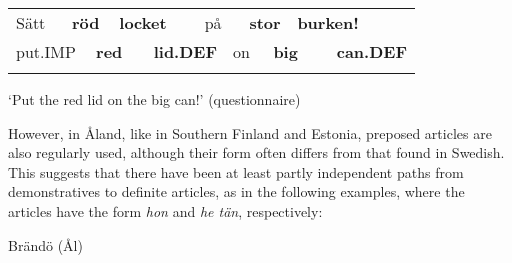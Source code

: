 \begin{tabular}{llllllllllll}
\lsptoprule
Sätt & \multicolumn{2}{l}{{\bfseries röd}

} & \multicolumn{2}{l}{{\bfseries locket}

} & \multicolumn{2}{l}{på

} & \multicolumn{2}{l}{{\bfseries stor}

} & \multicolumn{2}{l}{{\bfseries burken!}

} & \\
\multicolumn{2}{l}{put.IMP

} & \multicolumn{2}{l}{{\bfseries red}

} & \multicolumn{2}{l}{{\bfseries lid.DEF}

} & \multicolumn{2}{l}{on

} & \multicolumn{2}{l}{{\bfseries big}

} & \multicolumn{2}{l}{{\bfseries can.DEF}

}\\
\lspbottomrule
\end{tabular}

\begin{styleTranslation}
‘Put the red lid on the big can!’ (questionnaire)

\end{styleTranslation}

\begin{styleBodytextC}
However, in Åland, like in Southern Finland and Estonia, preposed articles are also regularly used, although their form often differs from that found in Swedish. This suggests that there have been at least partly independent paths from demonstratives to definite articles, as in the following examples, where the articles have the form \textit{hon} and \textit{he tän}, respectively:

\end{styleBodytextC}

\begin{listWWNumileveli}
\item 

\begin{styleExample}
Brändö (Ål)

\end{styleExample}

\end{listWWNumileveli}

